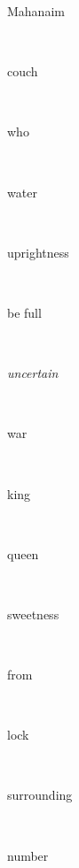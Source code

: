 \documentclass[a4paper]{article}
\begin{document}
\begin{multicols}{4}
\begin{multicols}{4}
\begin{multicols}{5}
{\hebrewfont{}} \begin{english}Mahanaim\end{english}\\
{\hebrewfont{}} \begin{english}couch\end{english}\\
{\hebrewfont{}} \begin{english}who\end{english}\\
{\hebrewfont{}} \begin{english}water\end{english}\\
{\hebrewfont{}} \begin{english}uprightness\end{english}\\
{\hebrewfont{}} \begin{english}be full\end{english}\\
{\hebrewfont{}} \begin{english}\textit{uncertain}\end{english}\\
{\hebrewfont{}} \begin{english}war\end{english}\\
{\hebrewfont{}} \begin{english}king\end{english}\\
{\hebrewfont{}} \begin{english}queen\end{english}\\
{\hebrewfont{}} \begin{english}sweetness\end{english}\\
{\hebrewfont{}} \begin{english}from\end{english}\\
{\hebrewfont{}} \begin{english}lock\end{english}\\
{\hebrewfont{}} \begin{english}surrounding\end{english}\\
{\hebrewfont{}} \begin{english}number\end{english}\\

\end{multicols}
\end{multicols}
\end{multicols}
\end{document}
